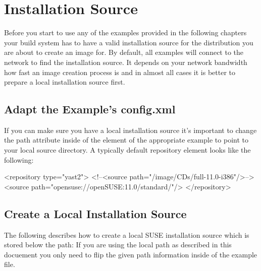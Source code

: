 \chapter{Installation Source}
\label{chapter:instsourcesetup}
\minitoc

Before you start to use any of the examples provided in the following
chapters your build system has to have a valid installation source for
the distribution you are about to create an image for.
By default, all examples will connect to the network to find the
installation source. It depends on your network bandwidth how fast
an image creation process is and in almost all cases it is better
to prepare a local installation source first.

\section{Adapt the Example's config.xml}
If you can make
sure you have a local installation source it's important to change
the path attribute inside of the  element of the
appropriate example to point to your local source directory.
A typically default repository element looks like the following:

\begin{xml}
<repository type="yast2">
   <!--<source path="/image/CDs/full-11.0-i386"/>-->
   <source path="opensuse://openSUSE:11.0/standard/"/>
</repository>
\end{xml}

\section{Create a Local Installation Source}
The following describes how to create a local SUSE installation
source which is stored below the path: 
If you are using the local path as described in this docuement
you only need to flip the given path information inside of
the example  file.

